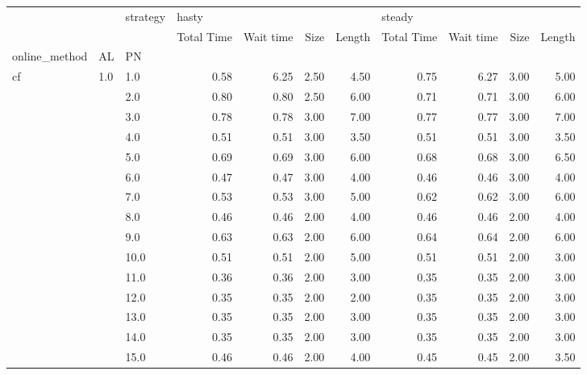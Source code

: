 \begin{tabular}{lllrrrrrrrr}
\toprule
   &     & strategy & \multicolumn{4}{l}{hasty} & \multicolumn{4}{l}{steady} \\
   &     & {} & Total Time & Wait time & Size & Length & Total Time & Wait time & Size & Length \\
online\_method & AL & PN &            &           &      &        &            &           &      &        \\
\midrule
cf & 1.0 & 1.0  &       0.58 &      6.25 & 2.50 &   4.50 &       0.75 &      6.27 & 3.00 &   5.00 \\
   &     & 2.0  &       0.80 &      0.80 & 2.50 &   6.00 &       0.71 &      0.71 & 3.00 &   6.00 \\
   &     & 3.0  &       0.78 &      0.78 & 3.00 &   7.00 &       0.77 &      0.77 & 3.00 &   7.00 \\
   &     & 4.0  &       0.51 &      0.51 & 3.00 &   3.50 &       0.51 &      0.51 & 3.00 &   3.50 \\
   &     & 5.0  &       0.69 &      0.69 & 3.00 &   6.00 &       0.68 &      0.68 & 3.00 &   6.50 \\
   &     & 6.0  &       0.47 &      0.47 & 3.00 &   4.00 &       0.46 &      0.46 & 3.00 &   4.00 \\
   &     & 7.0  &       0.53 &      0.53 & 3.00 &   5.00 &       0.62 &      0.62 & 3.00 &   6.00 \\
   &     & 8.0  &       0.46 &      0.46 & 2.00 &   4.00 &       0.46 &      0.46 & 2.00 &   4.00 \\
   &     & 9.0  &       0.63 &      0.63 & 2.00 &   6.00 &       0.64 &      0.64 & 2.00 &   6.00 \\
   &     & 10.0 &       0.51 &      0.51 & 2.00 &   5.00 &       0.51 &      0.51 & 2.00 &   3.00 \\
   &     & 11.0 &       0.36 &      0.36 & 2.00 &   3.00 &       0.35 &      0.35 & 2.00 &   3.00 \\
   &     & 12.0 &       0.35 &      0.35 & 2.00 &   2.00 &       0.35 &      0.35 & 2.00 &   3.00 \\
   &     & 13.0 &       0.35 &      0.35 & 2.00 &   3.00 &       0.35 &      0.35 & 2.00 &   3.00 \\
   &     & 14.0 &       0.35 &      0.35 & 2.00 &   3.00 &       0.35 &      0.35 & 2.00 &   3.00 \\
   &     & 15.0 &       0.46 &      0.46 & 2.00 &   4.00 &       0.45 &      0.45 & 2.00 &   3.50 \\

\end{tabular}
